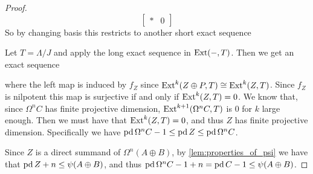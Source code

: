 \begin{theorem}
\begin{proof}
$$\begin{bmatrix}
		* & 0
		\end{bmatrix} $$
		So by changing basis this restricts to another short exact sequence
		\begin{center}
		\end{center}
		Let $T = \Lambda/J$ and apply the long exact sequence in $\operatorname{Ext}(-, T)$. Then we get an exact sequence
		\begin{center}
		\end{center}
		where the left map is induced by $f_Z$ since $\operatorname{Ext}^k(Z \oplus P, T) \cong \operatorname{Ext}^k(Z, T)$. Since $f_Z$ is nilpotent this map is surjective if and only if $\operatorname{Ext}^k(Z, T)=0$. We know that, since $\Omega^nC$ has finite projective dimension, $\operatorname{Ext}^{k+1}(\Omega^n C, T)$ is 0 for $k$ large enough. Then we must have that $\operatorname{Ext}^k(Z, T)=0$, and thus $Z$ has finite projective dimension. Specifically we have $\operatorname{pd}\Omega^n C -1 \leq \operatorname{pd} Z \leq \operatorname{pd}\Omega^n C$.
		
		Since $Z$ is a direct summand of $\Omega^n (A\oplus B)$, by \cref{lem:properties_of_psi} we have that $\operatorname{pd} Z + n \leq \psi(A \oplus B)$, and thus $\operatorname{pd} \Omega^n C - 1 + n = \operatorname{pd} C - 1 \leq \psi(A \oplus B)$.
	\end{proof}
\end{theorem}

